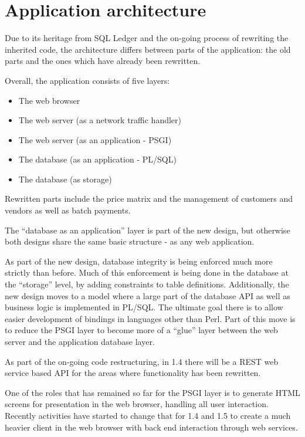 \section{Application architecture}
\label{sec-ledgersmb-architecture}

Due to its heritage from SQL Ledger and the on-going process of rewriting
the inherited code, the architecture differs between parts
of the application: the old parts and the ones which have already been
rewritten.

Overall, the application consists of five layers:

\begin{itemize}
\item The web browser
\item The web server (as a network traffic handler)
\item The web server (as an application - \gls{PSGI})
\item The database (as an application - PL/SQL)
\item The database (as storage)
\end{itemize}

Rewritten parts include the price matrix and the management of customers
and vendors as well as batch payments.

The ``database as an application'' layer is part of the new design, but otherwise
both designs share the same basic structure - as any web application.

As part of the new design, database integrity is being enforced much more
strictly than before.  Much of this enforcement is being done in the database
at the ``storage'' level, by adding constraints to table definitions. Additionally,
the new design moves to a model where a large part of the database API as well
as business logic is implemented in PL/SQL.  The ultimate goal there is to
allow easier development of bindings in languages other than Perl.  Part of this
move is to reduce the \gls{PSGI} layer to become more of a ``glue'' layer between
the web server and the application database layer.

As part of the on-going code restructuring, in 1.4 there will be a \gls{REST} web service
based API for the areas where functionality has been rewritten.

One of the roles that has remained so far for the \gls{PSGI} layer is to generate
\gls{HTML} screens for presentation in the web browser, handling all user interaction.
Recently activities have started to change that for 1.4 and 1.5 to create a
much heavier client in the web browser with back end interaction through
web services.

